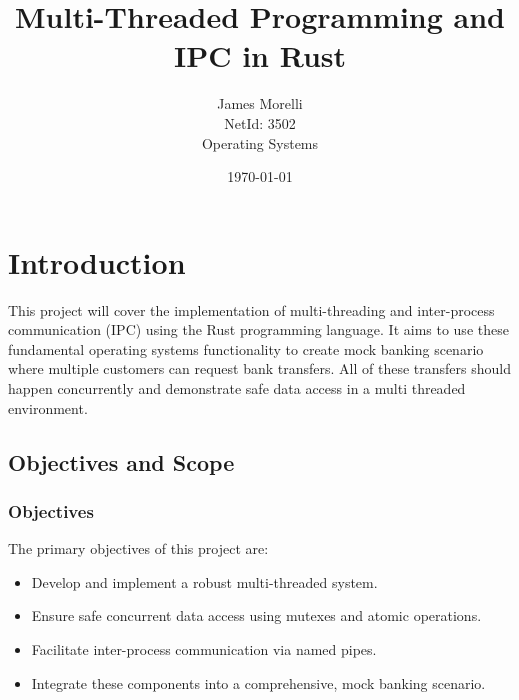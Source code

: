 \documentclass[conference]{report}
\begin{document}
\title{Multi-Threaded Programming
and IPC in Rust}
\author{James Morelli \\ \small NetId: 3502 \\ \small Operating Systems}
\date{\today}

\maketitle
\tableofcontents
\chapter{Introduction}
This project will cover the implementation of multi-threading and inter-process communication (IPC) using the Rust programming language. It aims to use these fundamental operating systems functionality to create mock banking scenario where multiple customers can request bank transfers. All of these transfers should happen concurrently and demonstrate safe data access in a multi threaded environment. 
\section*{Objectives and Scope}

\subsection*{Objectives}
The primary objectives of this project are:
\begin{itemize}
    \item Develop and implement a robust multi-threaded system.
    \item Ensure safe concurrent data access using mutexes and atomic operations.
    \item Facilitate inter-process communication via named pipes.
    \item Integrate these components into a comprehensive, mock banking scenario.
\end{itemize}
\end{document}
